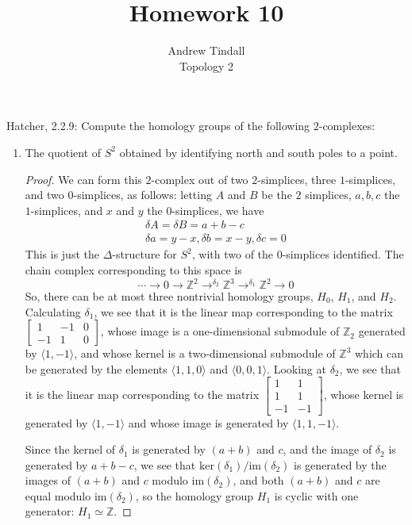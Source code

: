 \documentclass[12pt]{article}
\newcommand{\Z}{\mathbb{Z}}
\theoremstyle{definition}
\newenvironment{problem}[2][Problem]{\begin{trivlist}
\item[\hskip \labelsep {\bfseries #1}\hskip \labelsep {\bfseries #2.}]}{\end{trivlist}}
\begin{document}
 
 
\title{Homework 10}
\author{Andrew Tindall \\
Topology 2}
\begin{problem}{1}
	Hatcher, 2.2.9: Compute the homology groups of the following $2$-complexes:
	\begin{enumerate}[label=(\alph*)]
		\item The quotient of $S^2$ obtained by identifying north and south poles to a point.
			\begin{proof}
				We can form this $2$-complex out of two $2$-simplices, three $1$-simplices, and two $0$-simplices, as follows: letting $A$ and $B$ be the $2$ simplices, $a,b,c$ the $1$-simplices, and $x$ and $y$ the $0$-simplices, we have
				\begin{align*}\delta A = \delta B = a + b  -c\\
				\delta a = y - x, \delta b = x - y, \delta c = 0 \end{align*}
				This is just the $\Delta$-structure for $S^2$, with two of the $0$-simplices identified. The chain complex corresponding to this space is
				\[\cdots \to 0 \to \Z^2 \to^{\delta_2} \Z^3 \to^{\delta_1} \Z^2 \to 0 \]
				So, there can be at most three nontrivial homology groups, $H_0$, $H_1$, and $H_2$. Calculating $\delta_1$, we see that it is the linear map corresponding to the matrix $\begin{bmatrix}
					1 & -1 & 0\\
					-1 & 1 & 0
				\end{bmatrix}$, whose image is a one-dimensional submodule of $\Z_2$ generated by $\langle 1, -1\rangle$, and whose kernel is a two-dimensional submodule of $\Z^3$ which can be generated by the elements $\langle 1, 1, 0\rangle$ and $\langle 0,0,1\rangle$. Looking at $\delta_2$, we see that it is the linear map corresponding to the matrix $\begin{bmatrix}
					1 & 1 \\ 1 & 1 \\ -1 & -1
				\end{bmatrix}$, whose kernel is generated by $\langle 1, -1\rangle$ and whose image is generated by $\langle 1, 1, -1\rangle$. 
				\par Since the kernel of $\delta_1$ is generated by $(a + b)$ and $c$, and the image of $\delta_2$ is generated by $a + b - c$, we see that $\text{ker}(\delta_1) / \text{im}(\delta_2)$ is generated by the images of $(a + b)$ and $c$ modulo $\text{im}(\delta_2)$, and both $(a + b)$ and $c$ are equal modulo $\text{im}(\delta_2)$, so the homology group $H_1$ is cyclic with one generator: $H_1 \simeq \Z$.

\end{proof}
\end{enumerate}
\end{problem}
\end{document}
